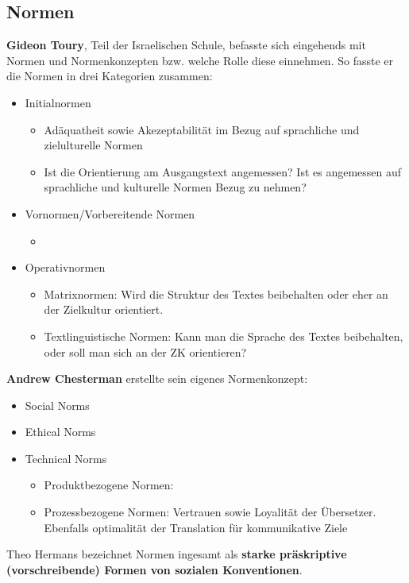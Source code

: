 \documentclass{article}
\begin{document}
	\subsection{Normen}
	\textbf{Gideon Toury}, Teil der Israelischen Schule, befasste sich eingehends mit Normen und Normenkonzepten bzw. welche Rolle diese einnehmen. So fasste er die Normen in drei Kategorien zusammen:
	\begin{itemize}
		\item{Initialnormen}
		\begin{itemize}
			\item{Adäquatheit sowie Akezeptabilität im Bezug auf sprachliche und zielulturelle Normen}
			\item{Ist die Orientierung am Ausgangstext angemessen? Ist es angemessen auf sprachliche und kulturelle Normen Bezug zu nehmen?}
		\end{itemize}
		\item{Vornormen/Vorbereitende Normen}
		\begin{itemize}
			\item{}
		\end{itemize}
		\item{Operativnormen}
		\begin{itemize}
			\item{Matrixnormen: Wird die Struktur des Textes beibehalten oder eher an der Zielkultur orientiert.}
			\item{Textlinguistische Normen: Kann man die Sprache des Textes beibehalten, oder soll man sich an der ZK orientieren?}
		\end{itemize}
	\end{itemize}

	\textbf{Andrew Chesterman} erstellte sein eigenes Normenkonzept:
	\begin{itemize}
		\item{Social Norms}
		\item{Ethical Norms}
		\item{Technical Norms}
		\begin{itemize}
			\item{Produktbezogene Normen: }
			\item{Prozessbezogene Normen: Vertrauen sowie Loyalität der Übersetzer. Ebenfalls optimalität der Translation für kommunikative Ziele}
		\end{itemize}
	\end{itemize}

	Theo Hermans bezeichnet Normen ingesamt als \textbf{starke präskriptive (vorschreibende) Formen von sozialen Konventionen}. \\
\end{document}
